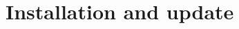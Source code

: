 \section{Installation and update}

\begin{frame}
\frametitle{}

\end{frame}

\begin{frame}
\frametitle{}

\end{frame}

\begin{frame}
\frametitle{}

\end{frame}

